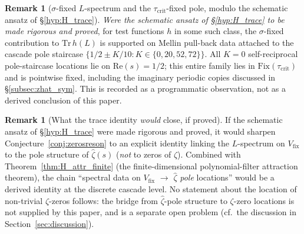 \documentclass[11pt, a4paper]{amsart}
\theoremstyle{definition}
\newtheorem{remark}[theorem]{Remark}
\begin{document}
\begin{remark}[$\sigma$-fixed $L$-spectrum and the
$\tau_{\mathrm{crit}}$-fixed pole, modulo the schematic ansatz of \S\ref{hyp:H_trace}]\label{rmk:sigma_fixed_to_pole}
\emph{Were the schematic ansatz of \S\ref{hyp:H_trace} to be made
rigorous and proved}, for test functions $h$ in some such class, the $\sigma$-fixed contribution to
$\mathrm{Tr}\,h(L)$ is supported on Mellin pull-back data attached
to the cascade pole staircase $\{1/2\pm K/10:K\in\{0,20,52,72\}\}$.
All $K = 0$ self-reciprocal pole-staircase locations lie on
$\mathrm{Re}(s) = 1/2$; this entire family lies in
$\mathrm{Fix}(\tau_{\mathrm{crit}})$ and is pointwise fixed,
including the imaginary periodic copies discussed in
\S\ref{subsec:zhat_sym}.  This is recorded as a programmatic
observation, not as a derived conclusion of this paper.
\end{remark}

\begin{remark}[What the trace identity \emph{would} close, if proved]\label{rmk:trace_closes}
If the schematic ansatz of \S\ref{hyp:H_trace} were made rigorous and proved, it would
sharpen Conjecture~\ref{conj:zerosreson} to an explicit identity
linking the $L$-spectrum on $V_{\mathrm{fix}}$ to the pole
structure of $\widehat\zeta(s)$ (\emph{not} to zeros of $\zeta$).
Combined with Theorem~\ref{thm:H_attr_finite} (the
finite-dimensional polynomial-filter attraction theorem), the chain
``spectral data on $V_{\mathrm{fix}}$ $\to$ $\widehat\zeta$
\emph{pole} locations'' would be a derived identity at the
discrete cascade level.  No statement about the location of
non-trivial $\zeta$-zeros follows: the bridge from
$\widehat\zeta$-pole structure to $\zeta$-zero locations is not
supplied by this paper, and is a separate open problem (cf.\ the
discussion in Section~\ref{sec:discussion}).
\end{remark}
\end{document}
